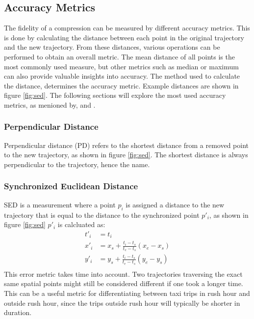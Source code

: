 \subsection{Accuracy Metrics}
The fidelity of a compression can be measured by different accuracy metrics. This is done by calculating the distance between each point in the original trajectory and the new trajectory. From these distances, various operations can be performed to obtain an overall metric. The mean distance of all points is the most commonly used measure, but other metrics such as median or maximum can also provide valuable insights into accuracy. The method used to calculate the distance, determines the accuracy metric. Example distances are shown in figure \ref{fig:sed}. The following sections will explore the most used accuracy metrics, as menioned by, \cite{TrajFramework} and \cite{Sun2016}.

\subsubsection{Perpendicular Distance}
\label{foobar:PD}
Perpendicular distance (PD) refers to the shortest distance from a removed point to the new trajectory, as shown in figure \ref{fig:sed}. The shortest distance is always perpendicular to the trajectory, hence the name.

\subsubsection{Synchronized Euclidean Distance}
\label{subsub:SED}
SED is a measurement where a point $p_{i}$ is assigned a distance to the new trajectory that is equal to the distance to the synchronized point $p'_{i}$, as shown in figure \ref{fig:sed} $p'_{i}$ is calcluated as:
\begin{equation}
    \begin{aligned}
        t'_{i} & = t_{i}                                                \\
        x'_{i} & = x_{s} + \frac{t_{i}-t_{s}}{t_{e}-t_{s}}(x_{e}-x_{s}) \\
        y'_{i} & = y_{s} + \frac{t_{i}-t_{s}}{t_{e}-t_{s}}(y_{e}-y_{s}) \\
    \end{aligned}
\end{equation}
This error metric takes time into account. Two trajectories traversing the exact same spatial points might still be considered different if one took a longer time. This can be a useful metric for differentiating between taxi trips in rush hour and outside rush hour, since the trips outside rush hour will typically be shorter in duration.

